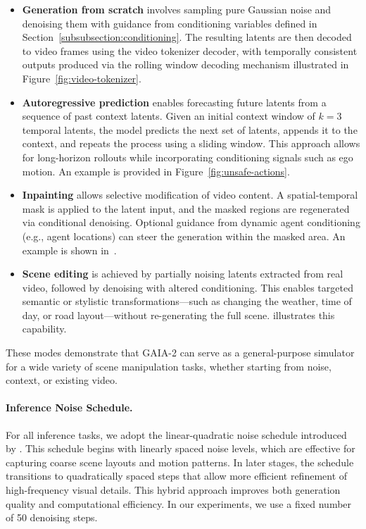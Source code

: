 \begin{itemize} 
\item \textbf{Generation from scratch} involves sampling pure Gaussian noise and denoising them with guidance from conditioning variables defined in Section~\ref{subsubsection:conditioning}. The resulting latents are then decoded to video frames using the video tokenizer decoder, with temporally consistent outputs produced via the rolling window decoding mechanism illustrated in Figure~\ref{fig:video-tokenizer}.

\item \textbf{Autoregressive prediction} enables forecasting future latents from a sequence of past context latents. Given an initial context window of $k=3$ temporal latents, the model predicts the next set of latents, appends it to the context, and repeats the process using a sliding window. This approach allows for long-horizon rollouts while incorporating conditioning signals such as ego motion. An example is provided in Figure~\ref{fig:unsafe-actions}.

\item \textbf{Inpainting} allows selective modification of video content. A spatial-temporal mask is applied to the latent input, and the masked regions are regenerated via conditional denoising. Optional guidance from dynamic agent conditioning (e.g., agent locations) can steer the generation within the masked area. An example is shown in~.

\item \textbf{Scene editing} is achieved by partially noising latents extracted from real video, followed by denoising with altered conditioning. This enables targeted semantic or stylistic transformations—such as changing the weather, time of day, or road layout—without re-generating the full scene.  illustrates this capability.
\end{itemize}
These modes demonstrate that GAIA-2 can serve as a general-purpose simulator for a wide variety of scene manipulation tasks, whether starting from noise, context, or existing video.


\paragraph{Inference Noise Schedule.}
For all inference tasks, we adopt the linear-quadratic noise schedule introduced by \cite{polyak2024movie}. This schedule begins with linearly spaced noise levels, which are effective for capturing coarse scene layouts and motion patterns. In later stages, the schedule transitions to quadratically spaced steps that allow more efficient refinement of high-frequency visual details. This hybrid approach improves both generation quality and computational efficiency. In our experiments, we use a fixed number of 50 denoising steps.



